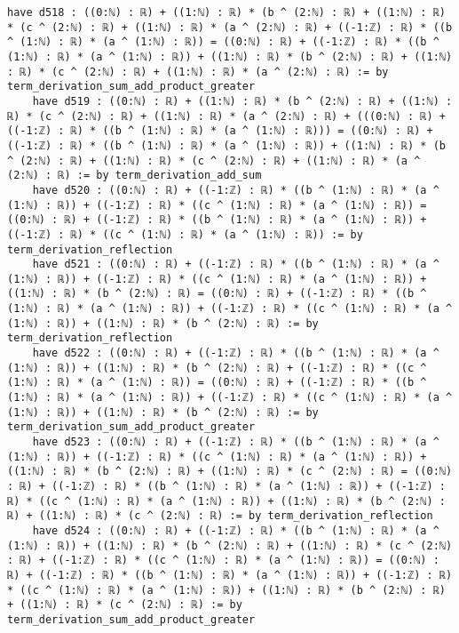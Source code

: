 \documentclass{article}
\begin{document}
\begin{tcolorbox}[colback=white!10, width=\linewidth]
\begin{lstlisting}[language=Lean4]
    have d518 : ((0:ℕ) : ℝ) + ((1:ℕ) : ℝ) * (b ^ (2:ℕ) : ℝ) + ((1:ℕ) : ℝ) * (c ^ (2:ℕ) : ℝ) + ((1:ℕ) : ℝ) * (a ^ (2:ℕ) : ℝ) + ((-1:ℤ) : ℝ) * ((b ^ (1:ℕ) : ℝ) * (a ^ (1:ℕ) : ℝ)) = ((0:ℕ) : ℝ) + ((-1:ℤ) : ℝ) * ((b ^ (1:ℕ) : ℝ) * (a ^ (1:ℕ) : ℝ)) + ((1:ℕ) : ℝ) * (b ^ (2:ℕ) : ℝ) + ((1:ℕ) : ℝ) * (c ^ (2:ℕ) : ℝ) + ((1:ℕ) : ℝ) * (a ^ (2:ℕ) : ℝ) := by term_derivation_sum_add_product_greater
    have d519 : ((0:ℕ) : ℝ) + ((1:ℕ) : ℝ) * (b ^ (2:ℕ) : ℝ) + ((1:ℕ) : ℝ) * (c ^ (2:ℕ) : ℝ) + ((1:ℕ) : ℝ) * (a ^ (2:ℕ) : ℝ) + (((0:ℕ) : ℝ) + ((-1:ℤ) : ℝ) * ((b ^ (1:ℕ) : ℝ) * (a ^ (1:ℕ) : ℝ))) = ((0:ℕ) : ℝ) + ((-1:ℤ) : ℝ) * ((b ^ (1:ℕ) : ℝ) * (a ^ (1:ℕ) : ℝ)) + ((1:ℕ) : ℝ) * (b ^ (2:ℕ) : ℝ) + ((1:ℕ) : ℝ) * (c ^ (2:ℕ) : ℝ) + ((1:ℕ) : ℝ) * (a ^ (2:ℕ) : ℝ) := by term_derivation_add_sum
    have d520 : ((0:ℕ) : ℝ) + ((-1:ℤ) : ℝ) * ((b ^ (1:ℕ) : ℝ) * (a ^ (1:ℕ) : ℝ)) + ((-1:ℤ) : ℝ) * ((c ^ (1:ℕ) : ℝ) * (a ^ (1:ℕ) : ℝ)) = ((0:ℕ) : ℝ) + ((-1:ℤ) : ℝ) * ((b ^ (1:ℕ) : ℝ) * (a ^ (1:ℕ) : ℝ)) + ((-1:ℤ) : ℝ) * ((c ^ (1:ℕ) : ℝ) * (a ^ (1:ℕ) : ℝ)) := by term_derivation_reflection
    have d521 : ((0:ℕ) : ℝ) + ((-1:ℤ) : ℝ) * ((b ^ (1:ℕ) : ℝ) * (a ^ (1:ℕ) : ℝ)) + ((-1:ℤ) : ℝ) * ((c ^ (1:ℕ) : ℝ) * (a ^ (1:ℕ) : ℝ)) + ((1:ℕ) : ℝ) * (b ^ (2:ℕ) : ℝ) = ((0:ℕ) : ℝ) + ((-1:ℤ) : ℝ) * ((b ^ (1:ℕ) : ℝ) * (a ^ (1:ℕ) : ℝ)) + ((-1:ℤ) : ℝ) * ((c ^ (1:ℕ) : ℝ) * (a ^ (1:ℕ) : ℝ)) + ((1:ℕ) : ℝ) * (b ^ (2:ℕ) : ℝ) := by term_derivation_reflection
    have d522 : ((0:ℕ) : ℝ) + ((-1:ℤ) : ℝ) * ((b ^ (1:ℕ) : ℝ) * (a ^ (1:ℕ) : ℝ)) + ((1:ℕ) : ℝ) * (b ^ (2:ℕ) : ℝ) + ((-1:ℤ) : ℝ) * ((c ^ (1:ℕ) : ℝ) * (a ^ (1:ℕ) : ℝ)) = ((0:ℕ) : ℝ) + ((-1:ℤ) : ℝ) * ((b ^ (1:ℕ) : ℝ) * (a ^ (1:ℕ) : ℝ)) + ((-1:ℤ) : ℝ) * ((c ^ (1:ℕ) : ℝ) * (a ^ (1:ℕ) : ℝ)) + ((1:ℕ) : ℝ) * (b ^ (2:ℕ) : ℝ) := by term_derivation_sum_add_product_greater
    have d523 : ((0:ℕ) : ℝ) + ((-1:ℤ) : ℝ) * ((b ^ (1:ℕ) : ℝ) * (a ^ (1:ℕ) : ℝ)) + ((-1:ℤ) : ℝ) * ((c ^ (1:ℕ) : ℝ) * (a ^ (1:ℕ) : ℝ)) + ((1:ℕ) : ℝ) * (b ^ (2:ℕ) : ℝ) + ((1:ℕ) : ℝ) * (c ^ (2:ℕ) : ℝ) = ((0:ℕ) : ℝ) + ((-1:ℤ) : ℝ) * ((b ^ (1:ℕ) : ℝ) * (a ^ (1:ℕ) : ℝ)) + ((-1:ℤ) : ℝ) * ((c ^ (1:ℕ) : ℝ) * (a ^ (1:ℕ) : ℝ)) + ((1:ℕ) : ℝ) * (b ^ (2:ℕ) : ℝ) + ((1:ℕ) : ℝ) * (c ^ (2:ℕ) : ℝ) := by term_derivation_reflection
    have d524 : ((0:ℕ) : ℝ) + ((-1:ℤ) : ℝ) * ((b ^ (1:ℕ) : ℝ) * (a ^ (1:ℕ) : ℝ)) + ((1:ℕ) : ℝ) * (b ^ (2:ℕ) : ℝ) + ((1:ℕ) : ℝ) * (c ^ (2:ℕ) : ℝ) + ((-1:ℤ) : ℝ) * ((c ^ (1:ℕ) : ℝ) * (a ^ (1:ℕ) : ℝ)) = ((0:ℕ) : ℝ) + ((-1:ℤ) : ℝ) * ((b ^ (1:ℕ) : ℝ) * (a ^ (1:ℕ) : ℝ)) + ((-1:ℤ) : ℝ) * ((c ^ (1:ℕ) : ℝ) * (a ^ (1:ℕ) : ℝ)) + ((1:ℕ) : ℝ) * (b ^ (2:ℕ) : ℝ) + ((1:ℕ) : ℝ) * (c ^ (2:ℕ) : ℝ) := by term_derivation_sum_add_product_greater

\end{lstlisting}
\end{tcolorbox}
\end{document}
